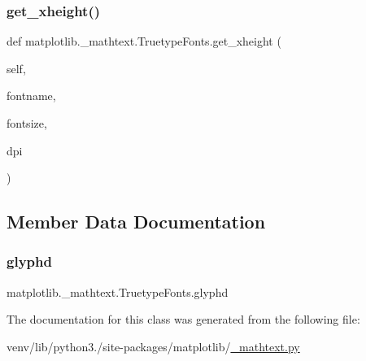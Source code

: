 \subsubsection{\texorpdfstring{get\+\_\+xheight()}{get\_xheight()}}
{\footnotesize\ttfamily def matplotlib.\+\_\+mathtext.\+Truetype\+Fonts.\+get\+\_\+xheight (\begin{DoxyParamCaption}\item[{}]{self,  }\item[{}]{fontname,  }\item[{}]{fontsize,  }\item[{}]{dpi }\end{DoxyParamCaption})}



\subsection{Member Data Documentation}
\mbox{\label{classmatplotlib_1_1__mathtext_1_1TruetypeFonts_afab1016d3c4199a67c43cdb921744baf}} 
\subsubsection{\texorpdfstring{glyphd}{glyphd}}
{\footnotesize\ttfamily matplotlib.\+\_\+mathtext.\+Truetype\+Fonts.\+glyphd}



The documentation for this class was generated from the following file\+:\begin{DoxyCompactItemize}
\item 
venv/lib/python3./site-\/packages/matplotlib/\hyperlink{__mathtext_8py}{\+\_\+mathtext.\+py}\end{DoxyCompactItemize}

